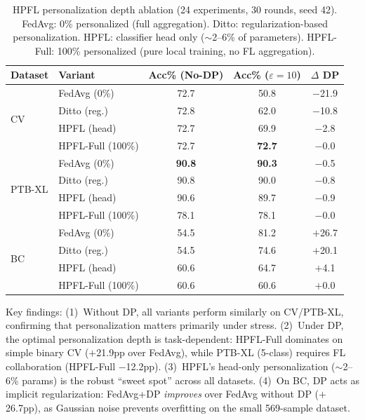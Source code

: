 \documentclass[conference]{IEEEtran}
\begin{document}
\begin{table}[htbp]
\centering
\caption{HPFL personalization depth ablation (24 experiments, 30 rounds, seed 42). FedAvg: 0\% personalized (full aggregation). Ditto: regularization-based personalization. HPFL: classifier head only ($\sim$2--6\% of parameters). HPFL-Full: 100\% personalized (pure local training, no FL aggregation).}
\label{tab:ablation}
\small
\begin{tabular}{llccc}
\toprule
\textbf{Dataset} & \textbf{Variant} & \textbf{Acc\% (No-DP)} & \textbf{Acc\% ($\varepsilon{=}10$)} & \textbf{$\Delta$ DP} \\
\midrule
\multirow{4}{*}{CV} & FedAvg (0\%) & 72.7 & 50.8 & $-$21.9 \\
 & Ditto (reg.) & 72.8 & 62.0 & $-$10.8 \\
 & HPFL (head) & 72.7 & 69.9 & $-$2.8 \\
 & HPFL-Full (100\%) & 72.7 & \textbf{72.7} & $-$0.0 \\
\midrule
\multirow{4}{*}{PTB-XL} & FedAvg (0\%) & \textbf{90.8} & \textbf{90.3} & $-$0.5 \\
 & Ditto (reg.) & 90.8 & 90.0 & $-$0.8 \\
 & HPFL (head) & 90.6 & 89.7 & $-$0.9 \\
 & HPFL-Full (100\%) & 78.1 & 78.1 & $-$0.0 \\
\midrule
\multirow{4}{*}{BC} & FedAvg (0\%) & 54.5 & 81.2 & $+$26.7 \\
 & Ditto (reg.) & 54.5 & 74.6 & $+$20.1 \\
 & HPFL (head) & 60.6 & 64.7 & $+$4.1 \\
 & HPFL-Full (100\%) & 60.6 & 60.6 & $+$0.0 \\
\bottomrule
\end{tabular}

\vspace{1mm}
\footnotesize{Key findings: (1)~Without DP, all variants perform similarly on CV/PTB-XL, confirming that personalization matters primarily under stress. (2)~Under DP, the optimal personalization depth is task-dependent: HPFL-Full dominates on simple binary CV ($+$21.9pp over FedAvg), while PTB-XL (5-class) requires FL collaboration (HPFL-Full $-$12.2pp). (3)~HPFL's head-only personalization ($\sim$2--6\% params) is the robust ``sweet spot'' across all datasets. (4)~On BC, DP acts as implicit regularization: FedAvg+DP \textit{improves} over FedAvg without DP ($+$26.7pp), as Gaussian noise prevents overfitting on the small 569-sample dataset.}
\end{table}
\end{document}
